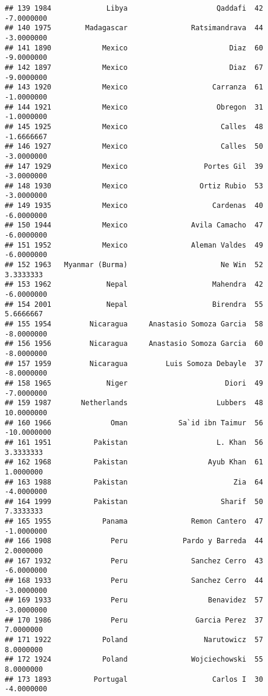 \documentclass[
]{article}
\begin{document}
\begin{verbatim}
## 139 1984             Libya                     Qaddafi  42   -7.0000000
## 140 1975        Madagascar               Ratsimandrava  44   -3.0000000
## 141 1890            Mexico                        Diaz  60   -9.0000000
## 142 1897            Mexico                        Diaz  67   -9.0000000
## 143 1920            Mexico                    Carranza  61   -1.0000000
## 144 1921            Mexico                     Obregon  31   -1.0000000
## 145 1925            Mexico                      Calles  48   -1.6666667
## 146 1927            Mexico                      Calles  50   -3.0000000
## 147 1929            Mexico                  Portes Gil  39   -3.0000000
## 148 1930            Mexico                 Ortiz Rubio  53   -3.0000000
## 149 1935            Mexico                    Cardenas  40   -6.0000000
## 150 1944            Mexico               Avila Camacho  47   -6.0000000
## 151 1952            Mexico               Aleman Valdes  49   -6.0000000
## 152 1963   Myanmar (Burma)                      Ne Win  52    3.3333333
## 153 1962             Nepal                    Mahendra  42   -6.0000000
## 154 2001             Nepal                    Birendra  55    5.6666667
## 155 1954         Nicaragua     Anastasio Somoza Garcia  58   -8.0000000
## 156 1956         Nicaragua     Anastasio Somoza Garcia  60   -8.0000000
## 157 1959         Nicaragua         Luis Somoza Debayle  37   -8.0000000
## 158 1965             Niger                       Diori  49   -7.0000000
## 159 1987       Netherlands                     Lubbers  48   10.0000000
## 160 1966              Oman            Sa`id ibn Taimur  56  -10.0000000
## 161 1951          Pakistan                     L. Khan  56    3.3333333
## 162 1968          Pakistan                   Ayub Khan  61    1.0000000
## 163 1988          Pakistan                         Zia  64   -4.0000000
## 164 1999          Pakistan                      Sharif  50    7.3333333
## 165 1955            Panama               Remon Cantero  47   -1.0000000
## 166 1908              Peru             Pardo y Barreda  44    2.0000000
## 167 1932              Peru               Sanchez Cerro  43   -6.0000000
## 168 1933              Peru               Sanchez Cerro  44   -3.0000000
## 169 1933              Peru                   Benavidez  57   -3.0000000
## 170 1986              Peru                Garcia Perez  37    7.0000000
## 171 1922            Poland                  Narutowicz  57    8.0000000
## 172 1924            Poland               Wojciechowski  55    8.0000000
## 173 1893          Portugal                    Carlos I  30   -4.0000000

\end{verbatim}
\end{document}
